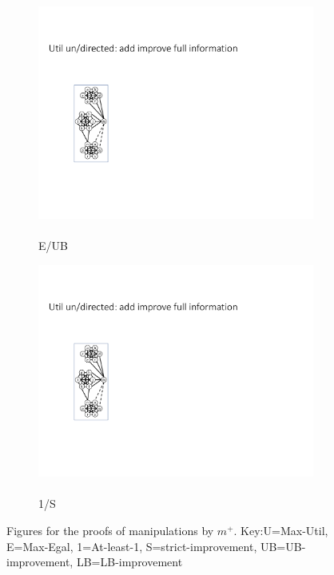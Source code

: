 \documentclass{article}
\begin{document}
\begin{figure}[t]
\begin{subfigure}{0.09\textwidth}
        \end{subfigure}
        \hfill
        \begin{subfigure}{0.09\textwidth}
            \centering
            \includegraphics[page=15,width=\textwidth]{Graphs/graphs.pdf}
            \caption{\\E/UB}
            \label{fig:Egal_undirected_add_UB}
        \end{subfigure}
        \hfill
        \begin{subfigure}{0.09\textwidth}
            \centering
            \includegraphics[page=49,width=\textwidth]{Graphs/graphs.pdf}
            \caption{\\1/S}
            \label{fig:Least1_undirected_add}
        \end{subfigure}
    
    
    \caption{Figures for the proofs of manipulations by $m^+$. Key:U=Max-Util, E=Max-Egal, 1=At-least-1, S=strict-improvement, UB=UB-improvement, LB=LB-improvement}
    \label{fig:add_graphs}
\end{figure}
\end{document}

